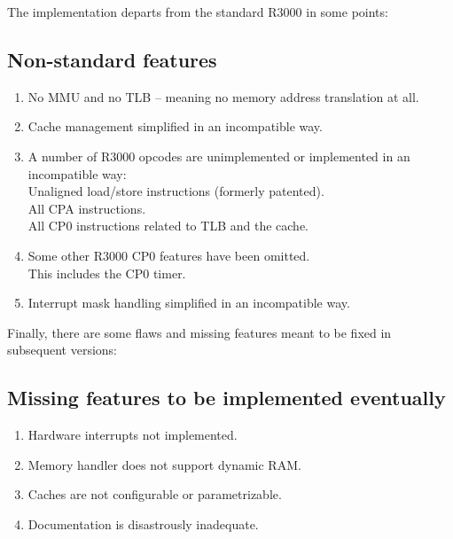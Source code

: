 The implementation departs from the standard R3000 in some points:

\begin{framed}
\subsection{Non-standard features}
\begin{enumerate}
    \item No MMU and no TLB -- meaning no memory address translation at all.
    \item Cache management simplified in an incompatible way.
    \item A number of R3000 opcodes are unimplemented or implemented in an 
          incompatible way:\\
        Unaligned load/store instructions (formerly patented).\\
        All CPA instructions.\\
        All CP0 instructions related to TLB and the cache.
    \item Some other R3000 CP0 features have been omitted.\\
        This includes the CP0 timer.
    \item Interrupt mask handling simplified in an incompatible way.
\end{enumerate}
\end{framed}

Finally, there are some flaws and missing features meant to be fixed in 
subsequent versions:

\begin{framed}
\subsection{Missing features to be implemented eventually}
\begin{enumerate}
    \item Hardware interrupts not implemented.
    \item Memory handler does not support dynamic RAM.
    \item Caches are not configurable or parametrizable.
    \item Documentation is disastrously inadequate.
\end{enumerate}
\end{framed}

    


